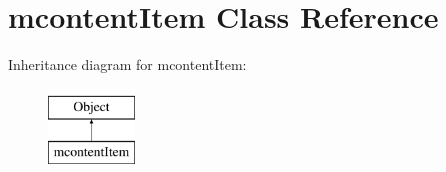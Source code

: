 \hypertarget{classmcontentItem}{\section{mcontent\-Item Class Reference}
\label{classmcontentItem}
}
Inheritance diagram for mcontent\-Item\-:\begin{figure}[H]
\begin{center}
\leavevmode
\includegraphics[height=2.000000cm]{classmcontentItem}
\end{center}
\end{figure}
